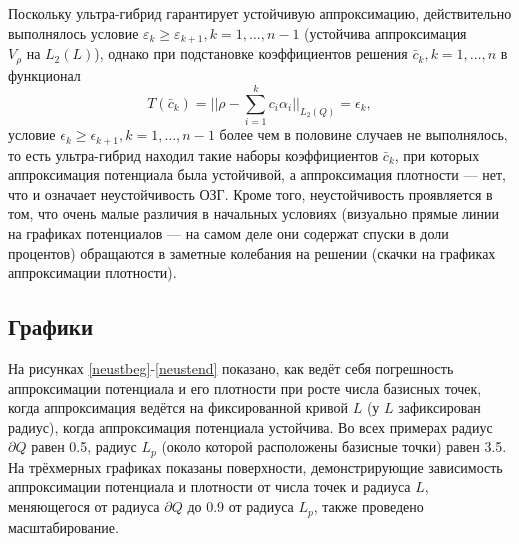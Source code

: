 \documentclass[a4paper, 12pt]{article}
\begin{document}
Поскольку ультра-гибрид гарантирует устойчивую аппроксимацию, действительно выполнялось условие $\varepsilon_k \geq \varepsilon_{k+1}, k=1, \dots, n-1$ (устойчива аппроксимация $V_{\rho} \text{ на } L_2(L)$), однако при подстановке коэффициентов решения $\bar c_k, k=1,\dots,n$ в функционал
\begin{equation*}
  T(\bar c_k)=\biggl|\biggl|\rho - \sum_{i=1}^k c_i \alpha_i\biggl|\biggl|_{L_2(Q)}=\epsilon_k,
\end{equation*}
условие $\epsilon_k \geq \epsilon_{k+1}, k=1, \dots, n-1$ более чем в половине случаев не выполнялось, то есть ультра-гибрид находил такие наборы коэффициентов $\bar c_k$, при которых
аппроксимация потенциала была устойчивой, а аппроксимация плотности --- нет, что и означает неустойчивость ОЗГ.
Кроме того, неустойчивость проявляется в том, что очень малые различия в начальных условиях (визуально прямые линии на графиках потенциалов --- на самом деле они содержат спуски в доли процентов) обращаются в заметные колебания на решении (скачки на графиках аппроксимации плотности). 

\subsection{Графики}
На рисунках \ref{neustbeg}-\ref{neustend} показано, как ведёт себя погрешность аппроксимации потенциала и его плотности при росте числа базисных точек, когда аппроксимация ведётся на фиксированной кривой $L$ (у $L$ зафиксирован радиус), когда аппроксимация потенциала устойчива.
Во всех примерах радиус $\partial Q$ равен 0.5, радиус $L_p$ (около которой расположены базисные точки) равен 3.5. На трёхмерных графиках показаны поверхности, демонстрирующие зависимость аппроксимации потенциала и плотности от числа точек и радиуса $L$, меняющегося от радиуса $\partial Q$ до 0.9 от радиуса $L_p$, также проведено масштабирование.
\end{document}

